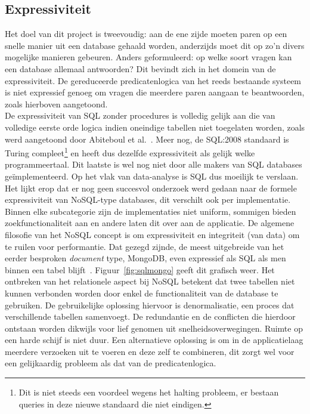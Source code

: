 \subsection{Expressiviteit}
Het doel van dit project is tweevoudig: aan de ene zijde moeten paren op een snelle manier uit een database gehaald worden, anderzijds moet dit op zo'n divers mogelijke manieren gebeuren. Anders geformuleerd: op welke soort vragen kan een database allemaal antwoorden? Dit bevindt zich in het domein van de expressiviteit. De gereduceerde predicatenlogica van het reeds bestaande systeem is niet expressief genoeg om vragen die meerdere paren aangaan te beantwoorden, zoals hierboven aangetoond.\\

De expressiviteit van SQL zonder procedures is volledig gelijk aan die van volledige eerste orde logica indien oneindige tabellen niet toegelaten worden, zoals werd aangetoond door Abiteboul et al.~\cite{Abiteboul95}. Meer nog, de SQL:2008 standaard is Turing compleet\footnote{Dit is niet steeds een voordeel wegens het halting probleem, er bestaan queries in deze nieuwe standaard die niet eindigen.} en heeft dus dezelfde expressiviteit als gelijk welke programmeertaal. Dit laatste is wel nog niet door alle makers van SQL databases ge\"implementeerd. Op het vlak van data-analyse is SQL dus moeilijk te verslaan.\\

Het lijkt erop dat er nog geen succesvol onderzoek werd gedaan naar de formele expressiviteit van NoSQL-type databases, dit verschilt ook per implementatie. Binnen elke subcategorie zijn de implementaties niet uniform, sommigen bieden zoekfunctionaliteit aan en andere laten dit over aan de applicatie. De algemene filosofie van het NoSQL concept is om expressiviteit en integriteit (van data) om te ruilen voor performantie. Dat gezegd zijnde, de meest uitgebreide van het eerder besproken \emph{document} type, MongoDB, even expressief als SQL als men binnen een tabel blijft~\cite{sqlnosql}. Figuur~\ref{fig:sqlmongo} geeft dit grafisch weer. Het ontbreken van het relationele aspect bij NoSQL betekent dat twee tabellen niet kunnen verbonden worden door enkel de functionaliteit van de database te gebruiken. De gebruikelijke oplossing hiervoor is denormalisatie, een proces dat verschillende tabellen samenvoegt. De redundantie en de conflicten die hierdoor ontstaan worden dikwijls voor lief genomen uit snelheidsoverwegingen. Ruimte op een harde schijf is niet duur. Een alternatieve oplossing is om in de applicatielaag meerdere verzoeken uit te voeren en deze zelf te combineren, dit zorgt wel voor een gelijkaardig probleem als dat van de predicatenlogica.\\

